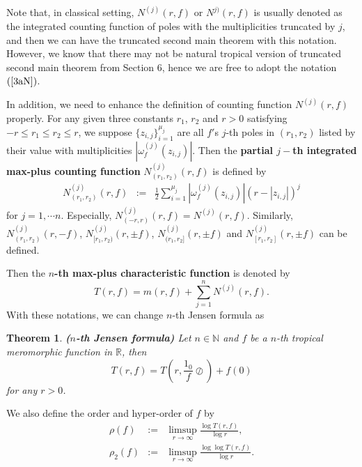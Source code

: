 \documentclass{article}
\newtheorem{theorem}[defin]{Theorem}
\begin{document}
    Note that, in classical setting, $N^{(j)}(r, f)$ or $N^{j)}(r, f)$ is usually denoted as the integrated counting function of poles with the multiplicities truncated by $j$, and then we can have the truncated second main theorem with this notation. However, we know that there may not be natural tropical version of truncated second main theorem from Section 6, hence we are free to adopt the notation $(\ref{3aN})$.

In addition, we need to enhance the definition of counting function $N^{(j)}(r, f)$ properly. For any given three constants $r_{1}$, $r_{2}$ and $r>0$ satisfying $-r\leq r_{1}\leq r_{2}\leq r$, we suppose $\{z_{i, j}\}_{i=1}^{\mu_{j}}$ are all $f'$s $j$-th poles in $(r_{1}, r_{2})$ listed by their value with multiplicities $|\omega_{f}^{(j)}(z_{i, j})|$. Then the \textbf{partial $j-$th integrated max-plus counting function}
     $N_{(r_{1}, r_{2})}^{(j)}(r, f)$ is defined by
    \begin{eqnarray*}
        N_{(r_{1}, r_{2})}^{(j)}(r, f)&:=&\frac{1}{2}\sum_{i=1}^{\mu_{j}}|\omega_{f}^{(j)}(z_{i, j})|(r-|z_{i, j}|)^{j}
    \end{eqnarray*}
for $j=1, \cdots n$.
Especially, $N_{(-r, r)}^{(j)}(r, f)=N^{(j)}(r, f)$. Similarly, $N_{(r_{1}, r_{2})}^{(j)}(r, -f)$, $N_{[r_{1}, r_{2})}^{(j)}(r, \pm f)$, $N_{(r_{1}, r_{2}]}^{(j)}(r, \pm f)$ and $N_{[r_{1}, r_{2}]}^{(j)}(r, \pm f)$ can be defined.
    
Then the \textbf{$n$-th max-plus characteristic function} is denoted by
    \begin{equation*}
        T(r, f)=m(r, f)+\sum_{j=1}^{n}N^{(j)}(r, f).
    \end{equation*}
With these notations, we can change $n$-th Jensen formula as
    \begin{theorem} \textbf{($n$-th Jensen formula)}
        Let $n\in\mathbb{N}$ and $f$ be a $n$-th tropical meromorphic function in $\mathbb{R}$, then
        \begin{equation}\label{3j1}
        T(r, f)=T\left(r, \frac{1_{0}}{f}\oslash\right)+f(0)
    \end{equation}
    for any $r>0$.
    \end{theorem}

    We also define the order and hyper-order of $f$ by
    \begin{eqnarray*}
        \rho(f)&:=&\limsup\limits_{r\rightarrow \infty}\frac{\log T(r, f)}{\log r},\\
        \rho_{2}(f)&:=&\limsup\limits_{r\rightarrow \infty}\frac{\log\log T(r, f)}{\log r}.
    \end{eqnarray*}
\end{document}

